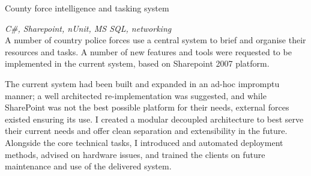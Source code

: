 \documentclass[]{friggeri-cv} %
\begin{document}
\begin{projectentrylist}
\projectentry
{County force intelligence and tasking system}
{\emph{C\#, Sharepoint, nUnit, MS SQL, networking} \\
A number of country police forces use a central system to brief and organise their resources and tasks. A number of new features and tools were requested to be implemented in the current system, based on Sharepoint 2007 platform.

The current system had been built and expanded in an ad-hoc impromptu manner; a well architected re-implementation was suggested, and while SharePoint was not the best possible platform for their needs, external forces existed ensuring its use. I created a modular decoupled architecture to best serve their current needs and offer clean separation and extensibility in the future. Alongside the core technical tasks, I introduced and automated deployment methods, advised on hardware issues, and trained the clients on future maintenance and use of the delivered system.}

\end{projectentrylist}


\end{document}
